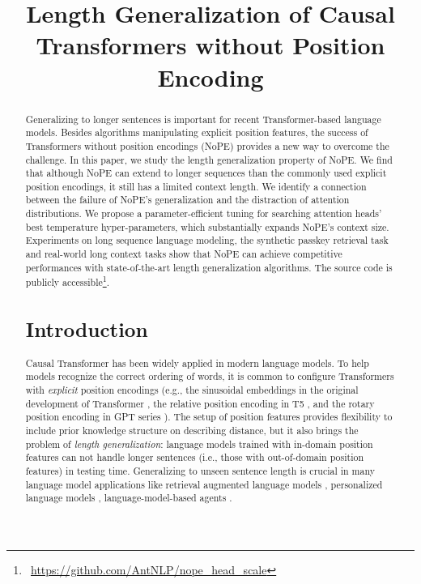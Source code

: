 \title{Length Generalization of Causal Transformers without Position Encoding}



\maketitle
\begin{abstract}

Generalizing to longer sentences
is important for recent Transformer-based language models.
Besides algorithms manipulating explicit position features,
the success of 
Transformers without position encodings (NoPE)
provides a new way to overcome the challenge.
In this paper, we study the length generalization property 
of NoPE.
We find that although NoPE can extend to longer sequences 
than the commonly used explicit position encodings, 
it still has a limited context length.
We identify a connection between the failure of NoPE’s 
generalization and the distraction of attention distributions.
We propose a parameter-efficient tuning for 
searching attention heads' best temperature hyper-parameters, 
which substantially expands NoPE's context size.
Experiments on long sequence language modeling, the synthetic
passkey retrieval task and real-world long context tasks show 
that NoPE can achieve competitive performances with state-of-the-art 
length generalization algorithms.
The source code is publicly 
accessible\footnote{$\ \ $\url{https://github.com/AntNLP/nope_head_scale}}.

\section{Introduction}
\label{sec:intro}

Causal Transformer has been widely applied 
in modern language models. 
To help models recognize the correct ordering of words, 
it is common to configure Transformers
with \emph{explicit} position encodings
(e.g., the sinusoidal embeddings in the original
development of Transformer \cite{NIPS2017_3f5ee243}, 
the relative position encoding in T5 \cite{JMLR:v21:20-074},
and the rotary position encoding in GPT series \cite{DBLP:journals/corr/abs-2104-09864}).
The setup of position features provides
flexibility to include prior knowledge structure on 
describing distance,
but it also brings the problem of \emph{length generalization}:
language models trained with in-domain position features
can not handle longer sentences 
(i.e., those with out-of-domain position features)
in testing time.
Generalizing to unseen sentence length
is crucial in many language model applications
like retrieval augmented language models \cite{DBLP:journals/jmlr/IzacardLLHPSDJRG23}, 
personalized language models \cite{wang2023rolellm},
language-model-based agents \cite{10.1145/3586183.3606763}.


\end{abstract}
